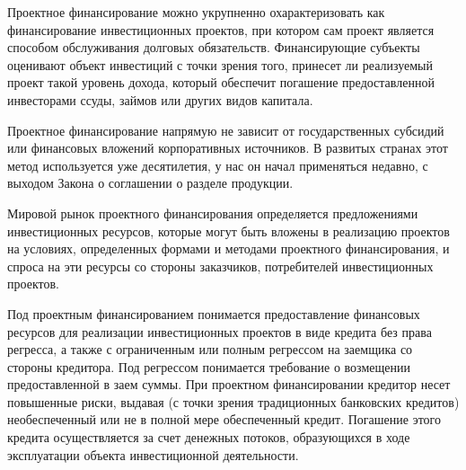 Проектное финансирование можно укрупненно охарактеризовать как финансирование инвестиционных проектов, при котором сам проект является способом обслуживания долговых обязательств.
Финансирующие субъекты оценивают объект инвестиций с точки зрения того, принесет ли реализуемый проект такой уровень дохода, который обеспечит погашение предоставленной инвесторами ссуды, займов или других видов капитала.

Проектное финансирование напрямую не зависит от государственных субсидий или финансовых вложений корпоративных источников.
В развитых странах этот метод используется уже десятилетия, у нас он начал применяться недавно, с выходом Закона о соглашении о разделе продукции.

Мировой рынок проектного финансирования определяется предложениями инвестиционных ресурсов, которые могут быть вложены в реализацию проектов на условиях, определенных формами и методами проектного финансирования, и спроса на эти ресурсы со стороны заказчиков, потребителей инвестиционных проектов.

Под проектным финансированием понимается предоставление финансовых ресурсов для реализации инвестиционных проектов в виде кредита без права регресса, а также с ограниченным или полным регрессом на заемщика со стороны кредитора.
Под регрессом понимается требование о возмещении предоставленной в заем суммы.
При проектном финансировании кредитор несет повышенные риски, выдавая (с точки зрения традиционных банковских кредитов) необеспеченный или не в полной мере обеспеченный кредит.
Погашение этого кредита осуществляется за счет денежных потоков, образующихся в ходе эксплуатации объекта инвестиционной деятельности.


